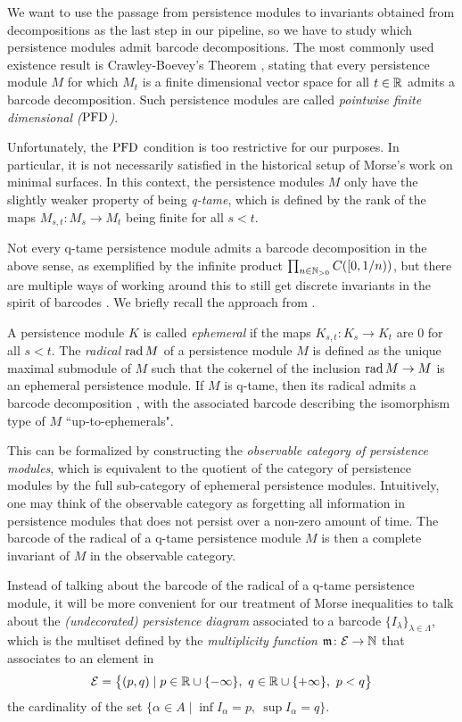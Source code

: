 We want to use the passage from persistence modules to invariants obtained from decompositions as the last step in our pipeline, so we have to study which persistence modules admit barcode decompositions.
The most commonly used existence result is Crawley-Boevey's Theorem \cite{Crawley-Boevey.2015}, stating that every persistence module $M$ for which $M_t$ is a finite dimensional vector space for all $t \in \mathbb{R}$ admits a barcode decomposition.
Such persistence modules are called \emph{pointwise finite dimensional ($\mathrm{PFD}$)}.

Unfortunately, the $\mathrm{PFD}$ condition is too restrictive for our purposes. In particular, it is not necessarily satisfied in the historical setup of Morse's work on minimal surfaces. In this context, the persistence modules $M$ only have the slightly weaker property of being \emph{q-tame}, which is defined by the rank of the maps $M_{s,t} \colon M_s \to M_t$ being finite for all $s < t$. 

Not every q-tame persistence module admits a barcode decomposition in the above sense, as exemplified by the infinite product $\prod_{n \in \mathbb{N}_{> 0}} C([0,1/n))$, but there are multiple ways of working around this to still get discrete invariants in the spirit of barcodes \cite{Chazal.2016a, Chazal.2016b, schmahl2020structure}. We briefly recall the approach from \citet{Chazal.2016b}.

A persistence module $K$ is called \emph{ephemeral} if the maps $K_{s,t} \colon K_s \to K_t$ are $0$ for all $s < t$.
The \emph{radical} $\operatorname{rad} M$ of a persistence module $M$ is defined as the unique maximal submodule of $M$ such that the cokernel of the inclusion $\operatorname{rad} M \to M$ is an ephemeral persistence module.
If $M$ is q-tame, then its radical admits a barcode decomposition \cite[Theorem ?]{Chazal.2016b},
with the associated barcode describing the isomorphism type of $M$ ``up-to-ephemerals".

This can be formalized by constructing the \emph{observable category of persistence modules}, which is equivalent to the quotient of the category of persistence modules by the full sub-category of ephemeral persistence modules.
Intuitively, one may think of the observable category as forgetting all information in persistence modules that does not persist over a non-zero amount of time.
The barcode of the radical of a q-tame persistence module $M$ is then a complete invariant of $M$ in the observable category.

Instead of talking about the barcode of the radical of a q-tame persistence module, it will be more convenient for our treatment of Morse inequalities to talk about the \emph{(undecorated) persistence diagram} associated to a barcode $\{I_{\lambda}\}_{\lambda \in \Lambda}$, which is the multiset defined by the \emph{multiplicity function} $\mathfrak{m} \colon \mathcal{E} \to \mathbb{N}$ that associates to an element in
\[
\mathcal{E} =
\big\{ (p,q) \mid p \in \mathbb{R} \cup \{-\infty\}, \ q \in \mathbb{R} \cup \{+\infty\}, \ p < q \big\}
\]
the cardinality of the set $\{ \alpha \in A \mid \inf I_{\alpha} = p,\ \sup I_{\alpha} = q\}$.

